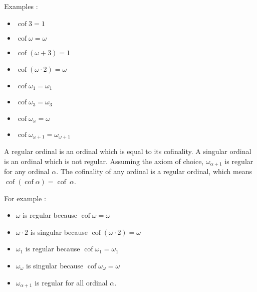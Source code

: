 \documentclass[10pt]{article}
\begin{document}
Examples :

\begin{itemize}
     \setlength{\itemsep}{1pt}
     \setlength{\parskip}{0pt}
     \setlength{\parsep}{0pt}

\item \( \operatorname{cof} 3 = 1 \)

\item \( \operatorname{cof} \omega = \omega \)

\item \( \operatorname{cof} (\omega+3) = 1 \)

\item \( \operatorname{cof} (\omega \cdot 2) = \omega \)

\item \( \operatorname{cof} \omega_1 = \omega_1 \)

\item \( \operatorname{cof} \omega_3 = \omega_3 \)

\item \( \operatorname{cof} \omega_\omega = \omega \)

\item \( \operatorname{cof} \omega_{\omega+1} = \omega_{\omega+1} \)

\end{itemize}

A regular ordinal is an ordinal which is equal to its cofinality. A singular ordinal is an ordinal which is not regular.
Assuming the axiom of choice, \( \omega_{\alpha+1} \) is regular for any ordinal \( \alpha \). The cofinality of any ordinal is a regular ordinal, which means \( \operatorname{cof}(\operatorname{cof} \alpha) = \operatorname{cof}\ \alpha \).

\bigskip

For example :

\begin{itemize}
     \setlength{\itemsep}{1pt}
     \setlength{\parskip}{0pt}
     \setlength{\parsep}{0pt}

\item \( \omega \) is regular because \( \operatorname{cof} \omega = \omega \)

\item \( \omega \cdot 2 \) is singular because \( \operatorname{cof} (\omega \cdot 2) = \omega \)

\item \( \omega_1 \) is regular because \( \operatorname{cof} \omega_1 = \omega_1 \)

\item \( \omega_\omega \) is singular because \( \operatorname{cof} \omega_\omega = \omega \)

\item \( \omega_{\alpha+1} \) is regular for all ordinal \( \alpha \).

\end{itemize}
\end{document}
